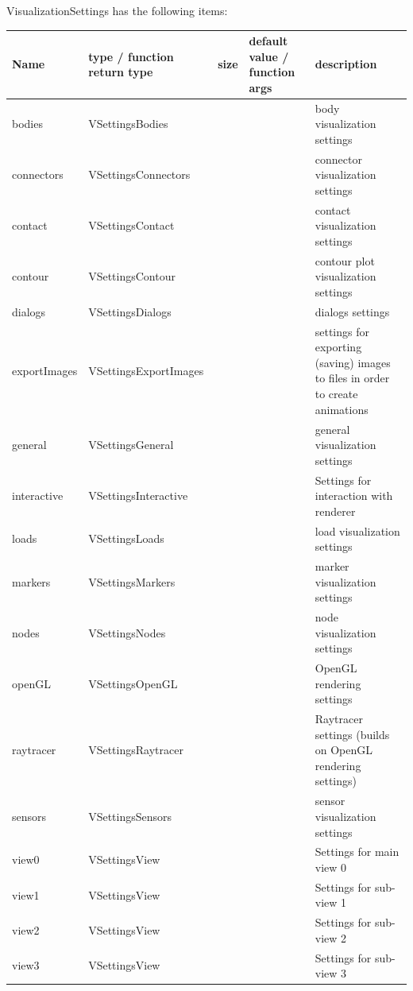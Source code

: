 \noindent VisualizationSettings has the following items:
\begin{center}
  \footnotesize
  \begin{longtable}{| p{4.2cm} | p{2.5cm} | p{0.3cm} | p{3.0cm} | p{6cm} |}
    \hline
    \bf Name & \bf type / function return type & \bf size & \bf default value / function args & \bf description \\ \hline
    bodies &     VSettingsBodies &      &      &     body visualization settings\\ \hline
    connectors &     VSettingsConnectors &      &      &     connector visualization settings\\ \hline
    contact &     VSettingsContact &      &      &     contact visualization settings\\ \hline
    contour &     VSettingsContour &      &      &     contour plot visualization settings\\ \hline
    dialogs &     VSettingsDialogs &      &      &     dialogs settings\\ \hline
    exportImages &     VSettingsExportImages &      &      &     settings for exporting (saving) images to files in order to create animations\\ \hline
    general &     VSettingsGeneral &      &      &     general visualization settings\\ \hline
    interactive &     VSettingsInteractive &      &      &     Settings for interaction with renderer\\ \hline
    loads &     VSettingsLoads &      &      &     load visualization settings\\ \hline
    markers &     VSettingsMarkers &      &      &     marker visualization settings\\ \hline
    nodes &     VSettingsNodes &      &      &     node visualization settings\\ \hline
    openGL &     VSettingsOpenGL &      &      &     OpenGL rendering settings\\ \hline
    raytracer &     VSettingsRaytracer &      &      &     Raytracer settings (builds on OpenGL rendering settings)\\ \hline
    sensors &     VSettingsSensors &      &      &     sensor visualization settings\\ \hline
    view0 &     VSettingsView &      &      &     Settings for main view 0\\ \hline
    view1 &     VSettingsView &      &      &     Settings for sub-view 1\\ \hline
    view2 &     VSettingsView &      &      &     Settings for sub-view 2\\ \hline
    view3 &     VSettingsView &      &      &     Settings for sub-view 3\\ \hline
	  \end{longtable}
	\end{center}

